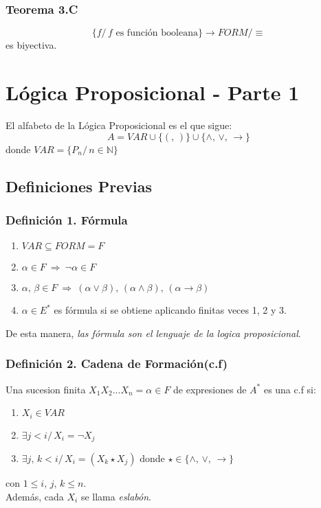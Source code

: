 \documentclass{article}
\newcommand{\comma}{,\,}                                %
\newcommand{\tq}{/\,}                                   %
\newcommand{\naturales}{\mathbb{N}}                     %
\newcommand{\Rightarrows}{\: \Rightarrow \:}            %
\begin{document}
\subsubsection{Teorema 3.C}
\begin{equation*}
    \{f \tq f \text{ es función booleana}\} \rightarrow FORM/\equiv
\end{equation*}
es biyectiva.

\newpage
\section{Lógica Proposicional - Parte 1}
El alfabeto de la Lógica Proposicional es el que sigue:
\begin{equation*}
	A = VAR \cup \{ ( \comma ) \} \cup \{ \wedge \comma \vee \comma \rightarrow \}
\end{equation*}
donde $VAR = \{ P_n \tq n \in \naturales \} $

\subsection{Definiciones Previas}
\subsubsection*{Definición 1. Fórmula}
\begin{enumerate}
	\item $VAR \subseteq FORM = F$
	\item $\alpha \in F \Rightarrows \neg \alpha \in F$
	\item $\alpha \comma \beta \in F \Rightarrows (\alpha \vee \beta) \comma (\alpha \wedge \beta) 
		\comma (\alpha \rightarrow \beta)$
	\item $\alpha \in E^*$ es fórmula si se obtiene aplicando finitas veces 1, 2 y 3.
\end{enumerate}
De esta manera, \emph{las fórmula son el lenguaje de la logica proposicional}.

\subsubsection*{Definición 2. Cadena de Formación(c.f)}
Una sucesion finita $X_1 X_2 ... X_n = \alpha \in F$ de expresiones de $A^*$ es una c.f si:
\begin{enumerate}
	\item $X_i \in VAR$
	\item $\exists j < i \tq X_i = \neg X_j$
	\item $\exists j \comma k < i \tq X_i = (X_k \star X_j)$ donde $\star \in 
		\{ \wedge \comma \vee \comma \rightarrow \}$
\end{enumerate}
con $1 \leq i \comma j \comma k \leq n$.
\\Además, cada $X_i$ se llama \emph{eslabón}.
\end{document}
